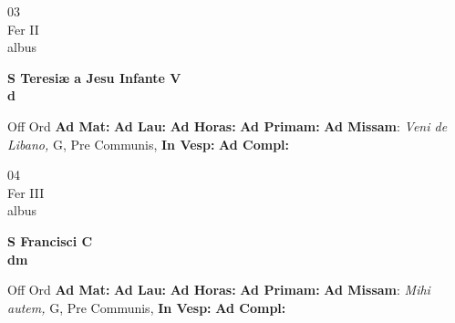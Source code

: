 \documentclass[10pt, openany]{book}
\begin{document}
        \begin{center}
            \begin{minipage}{3.5in}
                \vspace{2em}
                \begin{minipage}{0.5in}
                    {\Huge 03} \\
                    {\normalsize Fer II} \\
                    {\normalsize albus}
                \end{minipage}
                \begin{minipage}{3.0in}
                    \textbf{ \large S Teresiæ a Jesu Infante V \\
                    \textnormal{\normalsize d}} \\ 
                \end{minipage}
                \begin{justify}Off Ord
                    \textbf{Ad Mat: }
                    \textbf{Ad Lau: }
                    \textbf{Ad Horas: }
                    \textbf{Ad Primam: }\textbf{Ad Missam}: \textit{Veni de Libano,} G, Pre Communis,  
                    \textbf{In Vesp: }
                    \textbf{Ad Compl: }
                \end{justify}
            \end{minipage}
        \end{center}
    
        \begin{center}
            \begin{minipage}{3.5in}
                \vspace{2em}
                \begin{minipage}{0.5in}
                    {\Huge 04} \\
                    {\normalsize Fer III} \\
                    {\normalsize albus}
                \end{minipage}
                \begin{minipage}{3.0in}
                    \textbf{ \large S Francisci C \\
                    \textnormal{\normalsize dm}} \\ 
                \end{minipage}
                \begin{justify}Off Ord
                    \textbf{Ad Mat: }
                    \textbf{Ad Lau: }
                    \textbf{Ad Horas: }
                    \textbf{Ad Primam: }\textbf{Ad Missam}: \textit{Mihi autem,} G, Pre Communis,  
                    \textbf{In Vesp: }
                    \textbf{Ad Compl: }
                \end{justify}
            \end{minipage}
        \end{center}
    
\end{document}
